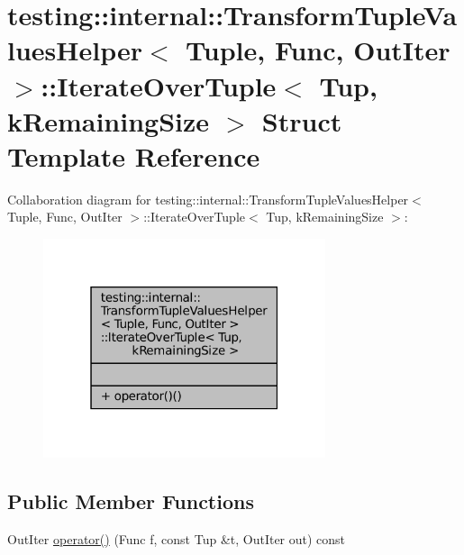 \hypertarget{structtesting_1_1internal_1_1TransformTupleValuesHelper_1_1IterateOverTuple}{}\section{testing\+:\+:internal\+:\+:Transform\+Tuple\+Values\+Helper$<$ Tuple, Func, Out\+Iter $>$\+:\+:Iterate\+Over\+Tuple$<$ Tup, k\+Remaining\+Size $>$ Struct Template Reference}
\label{structtesting_1_1internal_1_1TransformTupleValuesHelper_1_1IterateOverTuple}


Collaboration diagram for testing\+:\+:internal\+:\+:Transform\+Tuple\+Values\+Helper$<$ Tuple, Func, Out\+Iter $>$\+:\+:Iterate\+Over\+Tuple$<$ Tup, k\+Remaining\+Size $>$\+:
\nopagebreak
\begin{figure}[H]
\begin{center}
\leavevmode
\includegraphics[width=235pt]{structtesting_1_1internal_1_1TransformTupleValuesHelper_1_1IterateOverTuple__coll__graph}
\end{center}
\end{figure}
\subsection*{Public Member Functions}
\begin{DoxyCompactItemize}
\item 
Out\+Iter \hyperlink{structtesting_1_1internal_1_1TransformTupleValuesHelper_1_1IterateOverTuple_a2ce58379c68390ce846d6e7de1457411}{operator()} (Func f, const Tup \&t, Out\+Iter out) const
\end{DoxyCompactItemize}


